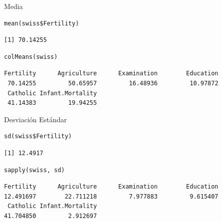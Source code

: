 \documentclass[xcolor={usenames,svgnames,dvipsnames}]{beamer}
\begin{document}
\begin{frame}[fragile,label=sec-2-2]{Media}
 \lstset{language=R,label= ,caption= ,numbers=none}
\begin{lstlisting}
mean(swiss$Fertility)
\end{lstlisting}

\begin{verbatim}
[1] 70.14255
\end{verbatim}

\lstset{language=R,label= ,caption= ,numbers=none}
\begin{lstlisting}
colMeans(swiss)
\end{lstlisting}

\begin{verbatim}
Fertility      Agriculture      Examination        Education 
 70.14255         50.65957         16.48936         10.97872 
 Catholic Infant.Mortality 
 41.14383         19.94255
\end{verbatim}
\end{frame}

\begin{frame}[fragile,label=sec-2-3]{Desviación Estándar}
 \lstset{language=R,label= ,caption= ,numbers=none}
\begin{lstlisting}
sd(swiss$Fertility)
\end{lstlisting}

\begin{verbatim}
[1] 12.4917
\end{verbatim}

\lstset{language=R,label= ,caption= ,numbers=none}
\begin{lstlisting}
sapply(swiss, sd)
\end{lstlisting}

\begin{verbatim}
Fertility      Agriculture      Examination        Education 
12.491697        22.711218         7.977883         9.615407 
 Catholic Infant.Mortality 
41.704850         2.912697
\end{verbatim}
\end{frame}
\end{document}
